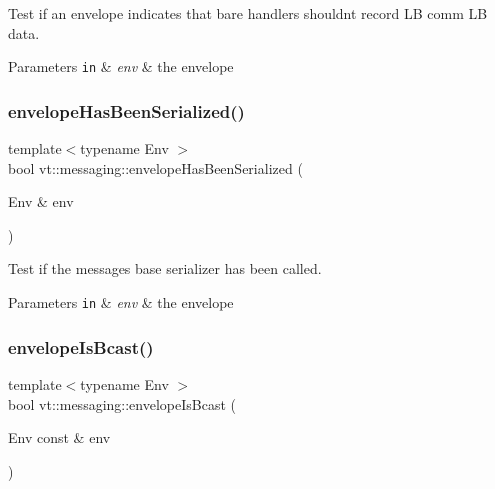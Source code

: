 Test if an envelope indicates that bare handlers shouldn\textquotesingle{}t record LB comm LB data. 


\begin{DoxyParams}[1]{Parameters}
\mbox{\tt in}  & {\em env} & the envelope \\
\hline
\end{DoxyParams}
\mbox{\label{namespacevt_1_1messaging_af984147f8c3e5bc9a34eb354ed2808d3}} 
\subsubsection{\texorpdfstring{envelope\+Has\+Been\+Serialized()}{envelopeHasBeenSerialized()}}
{\footnotesize\ttfamily template$<$typename Env $>$ \\
bool vt\+::messaging\+::envelope\+Has\+Been\+Serialized (\begin{DoxyParamCaption}\item[{Env \&}]{env }\end{DoxyParamCaption})\hspace{0.3cm}{\ttfamily [inline]}}



Test if the message\textquotesingle{}s base serializer has been called. 


\begin{DoxyParams}[1]{Parameters}
\mbox{\tt in}  & {\em env} & the envelope \\
\hline
\end{DoxyParams}
\mbox{\label{namespacevt_1_1messaging_a54db7616bc28f0aec1a4830acc2105f7}} 
\subsubsection{\texorpdfstring{envelope\+Is\+Bcast()}{envelopeIsBcast()}}
{\footnotesize\ttfamily template$<$typename Env $>$ \\
bool vt\+::messaging\+::envelope\+Is\+Bcast (\begin{DoxyParamCaption}\item[{Env const \&}]{env }\end{DoxyParamCaption})\hspace{0.3cm}{\ttfamily [inline]}}



